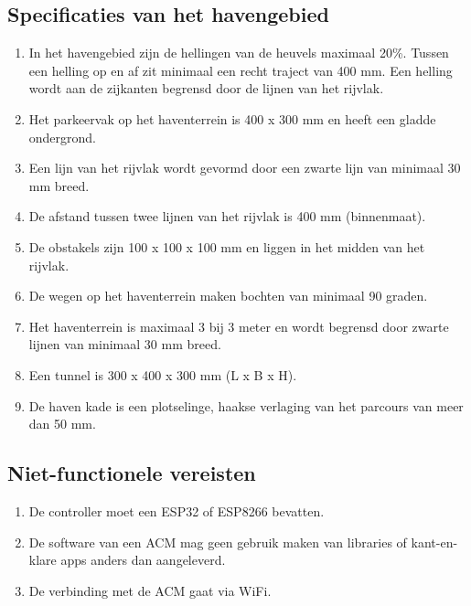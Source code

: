 \subsection{Specificaties van het havengebied}
\begin{enumerate}
    \item In het havengebied zijn de hellingen van de heuvels maximaal 20\%. Tussen een helling op en af zit minimaal een recht traject van 400 mm. Een helling wordt aan de zijkanten begrensd door de lijnen van het rijvlak.
    \item Het parkeervak op het haventerrein is 400 x 300 mm en heeft een gladde ondergrond.
    \item Een lijn van het rijvlak wordt gevormd door een zwarte lijn van minimaal 30 mm breed.
    \item De afstand tussen twee lijnen van het rijvlak is 400 mm (binnenmaat).
    \item De obstakels zijn 100 x 100 x 100 mm en liggen in het midden van het rijvlak.
    \item De wegen op het haventerrein maken bochten van minimaal 90 graden.
    \item Het haventerrein is maximaal 3 bij 3 meter en wordt begrensd door zwarte lijnen van minimaal 30 mm breed.
    \item Een tunnel is 300 x 400 x 300 mm (L x B x H).
    \item De haven kade is een plotselinge, haakse verlaging van het parcours van meer dan 50 mm.
\end{enumerate}

\subsection{Niet-functionele vereisten}
\begin{enumerate}
    \item De controller moet een ESP32 of ESP8266 bevatten.
    \item De software van een ACM mag geen gebruik maken van libraries of kant-en-klare apps anders dan aangeleverd.
    \item De verbinding met de ACM gaat via WiFi.
\end{enumerate}